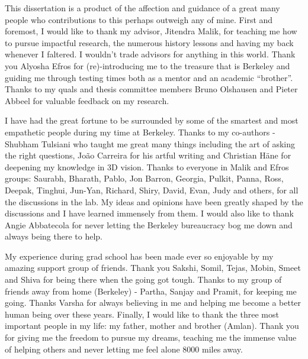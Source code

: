 This dissertation is a product of the affection and guidance of a great many people who contributions to this perhaps outweigh any of mine. First and foremost, I would like to thank my advisor, Jitendra Malik, for teaching me how to pursue impactful research, the numerous history lessons and having my back whenever I faltered. I wouldn't trade advisors for anything in this world. Thank you Alyosha Efros for (re)-introducing me to the treasure that is Berkeley and guiding me through testing times both as a mentor and an academic ``brother''. Thanks to my quals and thesis committee members Bruno Olshausen and Pieter Abbeel for valuable feedback on my research.

I have had the great fortune to be surrounded by some of the smartest and most empathetic people during my time at Berkeley. Thanks to my co-authors - Shubham Tulsiani who taught me great many things including the art of asking the right questions, Jo\~ao Carreira for his artful writing and Christian H\"ane for deepening my knowledge in 3D vision. Thanks to everyone in Malik and Efros groups: Saurabh, Bharath, Pablo, Jon Barron, Georgia, Pulkit, Panna, Ross, Deepak, Tinghui, Jun-Yan, Richard, Shiry, David, Evan, Judy and others, for all the discussions in the lab. My ideas and opinions have been greatly shaped by the discussions and I have learned immensely from them. I would also like to thank Angie Abbatecola for never letting the Berkeley bureaucracy bog me down and always being there to help.

My experience during grad school has been made ever so enjoyable by my amazing support group of friends. Thank you Sakshi, Somil, Tejas, Mobin, Smeet and Shiva for being there when the going got tough. Thanks to my group of friends away from home (Berkeley) - Partha, Sanjay and Pramit, for keeping me going. Thanks Varsha for always believing in me and helping me become a better human being over these years. Finally, I would like to thank the three most important people in my life: my father, mother and brother (Amlan). Thank you for giving me the freedom to pursue my dreams, teaching me the immense value of helping others and never letting me feel alone 8000 miles away.